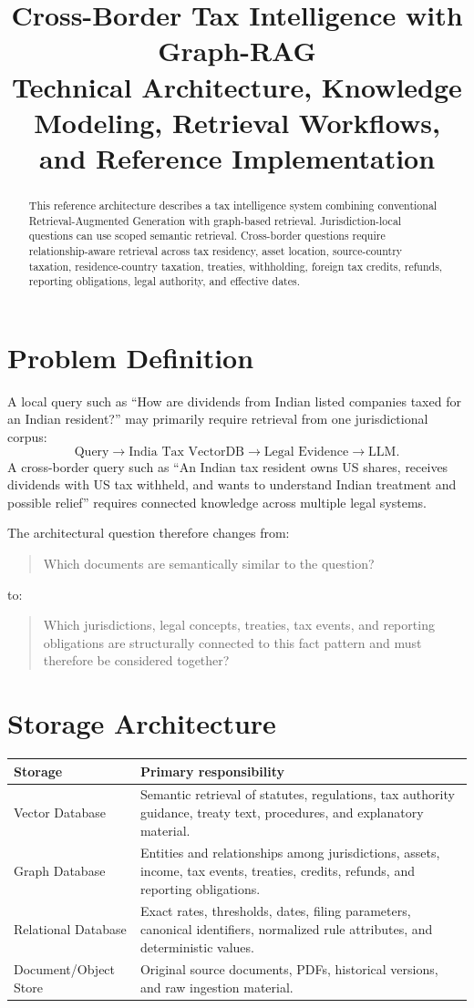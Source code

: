 \documentclass[11pt,a4paper]{article}
\title{\textbf{Cross-Border Tax Intelligence with Graph-RAG}\\\large Technical Architecture, Knowledge Modeling, Retrieval Workflows, and Reference Implementation}
\author{}\date{}
\begin{document}
\maketitle
\begin{abstract}
This reference architecture describes a tax intelligence system combining conventional Retrieval-Augmented Generation with graph-based retrieval. Jurisdiction-local questions can use scoped semantic retrieval. Cross-border questions require relationship-aware retrieval across tax residency, asset location, source-country taxation, residence-country taxation, treaties, withholding, foreign tax credits, refunds, reporting obligations, legal authority, and effective dates.
\end{abstract}
\tableofcontents\newpage

\section{Problem Definition}
A local query such as ``How are dividends from Indian listed companies taxed for an Indian resident?'' may primarily require retrieval from one jurisdictional corpus:
\[
\text{Query}\rightarrow\text{India Tax VectorDB}\rightarrow\text{Legal Evidence}\rightarrow\text{LLM}.
\]
A cross-border query such as ``An Indian tax resident owns US shares, receives dividends with US tax withheld, and wants to understand Indian treatment and possible relief'' requires connected knowledge across multiple legal systems.

The architectural question therefore changes from:
\begin{quote}Which documents are semantically similar to the question?\end{quote}
to:
\begin{quote}Which jurisdictions, legal concepts, treaties, tax events, and reporting obligations are structurally connected to this fact pattern and must therefore be considered together?\end{quote}

\section{Storage Architecture}
\begin{center}
\begin{tabular}{p{3.2cm}p{10cm}}\toprule
Storage & Primary responsibility\\\midrule
Vector Database & Semantic retrieval of statutes, regulations, tax authority guidance, treaty text, procedures, and explanatory material.\\
Graph Database & Entities and relationships among jurisdictions, assets, income, tax events, treaties, credits, refunds, and reporting obligations.\\
Relational Database & Exact rates, thresholds, dates, filing parameters, canonical identifiers, normalized rule attributes, and deterministic values.\\
Document/Object Store & Original source documents, PDFs, historical versions, and raw ingestion material.\\\bottomrule
\end{tabular}
\end{center}
\end{document}
